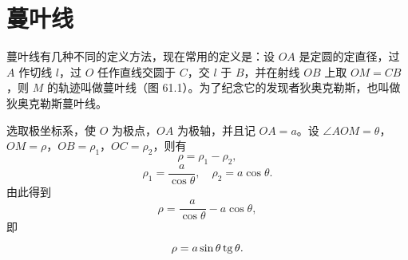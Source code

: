 \section{蔓叶线}

蔓叶线有几种不同的定义方法，现在常用的定义是：设 $OA$ 是定圆的定直径，过 $A$ 作切线 $l$，过 $O$ 任作直线交圆于 $C$，交 $l$ 于 $B$，并在射线 $OB$ 上取 $OM=CB$，则 $M$ 的轨迹叫做蔓叶线（图 61.1）。为了纪念它的发现者狄奥克勒斯，也叫做狄奥克勒斯蔓叶线。

\noindent
\begin{minipage}[t]{0.53\textwidth}
  \vspace{0pt}
  \hspace{2em}选取极坐标系，使 $O$ 为极点，$OA$ 为极轴，并且记 $OA=a$。设 $\angle AOM=\theta$，$OM=\rho$，$OB=\rho_1$，$OC=\rho_2$，则有
  \[
    \rho = \rho_1 - \rho_2,
  \]
  \[
    \rho_1 = \frac{a}{\cos\theta},\quad \rho_2 = a\cos\theta.
  \]
  由此得到
  \[
    \rho = \frac{a}{\cos\theta} - a\cos\theta,
  \]
  即
  \[
    \rho = a\sin\theta\operatorname{tg}\theta.
  \]
\end{minipage}
\hfill
